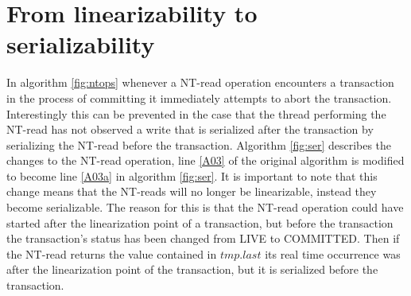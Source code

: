 \begin{figure} [htb]
\end{figure}





\section{From linearizability to serializability}

In algorithm \ref{fig:ntops} whenever a NT-read operation encounters
a transaction in the process of committing it immediately attempts to abort the transaction.
Interestingly this can be prevented
in the case that the thread performing the NT-read has not observed a write that is serialized after the transaction
by serializing the NT-read before the transaction.
Algorithm \ref{fig:ser} describes the changes to the NT-read operation, line \ref{A03} of
the original algorithm is modified to become line \ref{A03a} in algorithm \ref{fig:ser}.
It is important to note that this change means that the NT-reads will no longer be linearizable,
instead they become serializable.
The reason for this is that the NT-read operation could have started after the linearization point
of a transaction, but before the transaction the transaction's status has been changed from LIVE to
COMMITTED.
Then if the NT-read returns the value contained in $\mathit{tmp.last}$ its real time occurrence was
after the linearization point of the transaction, but it is serialized before the transaction.










